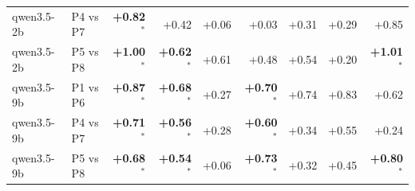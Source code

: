 \begin{table}[p]
\begin{tabular}{llrrrrrrr}
qwen3.5-2b & P4 vs P7 & \textbf{+0.82$^{*}$} & +0.42 & +0.06 & +0.03 & +0.31 & +0.29 & +0.85 \\
qwen3.5-2b & P5 vs P8 & \textbf{+1.00$^{*}$} & \textbf{+0.62$^{*}$} & +0.61 & +0.48 & +0.54 & +0.20 & \textbf{+1.01$^{*}$} \\
qwen3.5-9b & P1 vs P6 & \textbf{+0.87$^{*}$} & \textbf{+0.68$^{*}$} & +0.27 & \textbf{+0.70$^{*}$} & +0.74 & +0.83 & +0.62 \\
qwen3.5-9b & P4 vs P7 & \textbf{+0.71$^{*}$} & \textbf{+0.56$^{*}$} & +0.28 & \textbf{+0.60$^{*}$} & +0.34 & +0.55 & +0.24 \\
qwen3.5-9b & P5 vs P8 & \textbf{+0.68$^{*}$} & \textbf{+0.54$^{*}$} & +0.06 & \textbf{+0.73$^{*}$} & +0.32 & +0.45 & \textbf{+0.80$^{*}$} \\
\bottomrule
\end{tabular}
\end{table}
